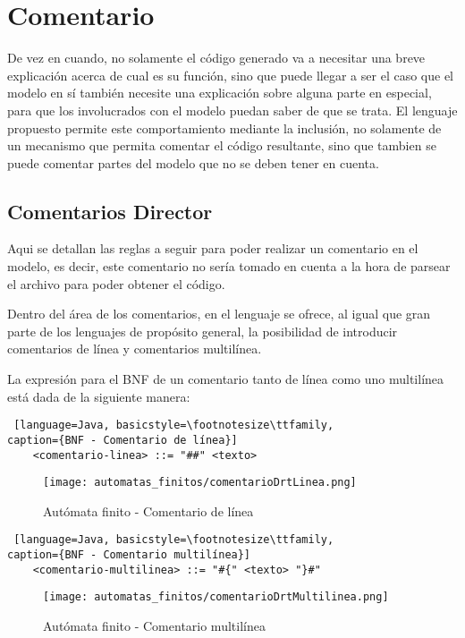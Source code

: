 \section{Comentario}
\label{sec:comentario}
De vez en cuando, no solamente el código generado va a necesitar una breve
explicación acerca de cual es su función, sino que puede llegar a ser el caso
que el modelo en sí también necesite una explicación sobre alguna parte en
especial, para que los involucrados con el modelo puedan saber de que se trata.
El lenguaje propuesto permite este comportamiento mediante la inclusión, no
solamente de un mecanismo que permita comentar el código resultante, sino que
tambien se puede comentar partes del modelo que no se deben tener en cuenta.

\subsection{Comentarios Director}
\label{sub:comentariosdrt}
Aqui se detallan las reglas a seguir para poder realizar un comentario en el
modelo, es decir, este comentario no sería tomado en cuenta a la hora de
parsear el archivo para poder obtener el código.

Dentro del área de los comentarios, en el lenguaje se ofrece, al igual que gran
parte de los lenguajes de propósito general, la posibilidad de introducir
comentarios de línea y comentarios multilínea.

La expresión para el BNF de un comentario tanto de línea como uno multilínea
está dada de la siguiente manera:

\begin{lstlisting} [language=Java, basicstyle=\footnotesize\ttfamily,
caption={BNF - Comentario de línea}]
	<comentario-linea> ::= "##" <texto>
\end{lstlisting}

\begin{figure}[H]
	\centering
	\texttt{[image: automatas\_finitos/comentarioDrtLinea.png]}
	\caption{Autómata finito - Comentario de línea}
	\label{fig:af_com_linea}
\end{figure}

\begin{lstlisting} [language=Java, basicstyle=\footnotesize\ttfamily,
caption={BNF - Comentario multilínea}]
	<comentario-multilinea> ::= "#{" <texto> "}#"
\end{lstlisting}

\begin{figure}[H]
	\centering
	\texttt{[image: automatas\_finitos/comentarioDrtMultilinea.png]}
	\caption{Autómata finito - Comentario multilínea}
	\label{fig:af_com_multi}
\end{figure}

